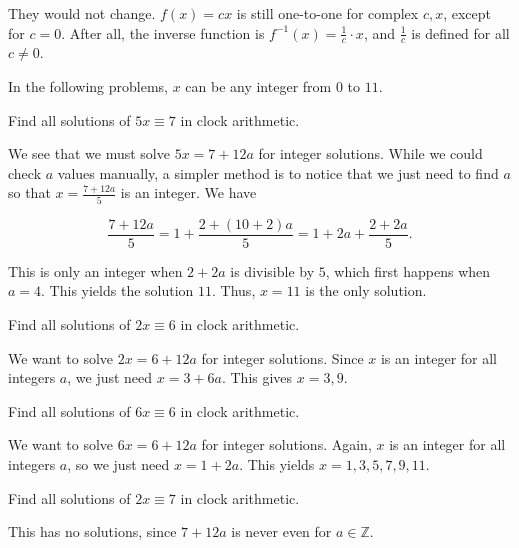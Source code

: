 \documentclass[../key.tex]{subfiles}
\begin{document}
They would not change. $f(x)=cx$ is still one-to-one for complex $c,x$, except for $c=0$. After all, the inverse function is $f^{-1}(x)=\frac{1}{c}\cdot x$, and $\frac{1}{c}$ is defined for all $c\neq 0$.

\begin{outer_problem}
\item In the following problems, $x$ can be any integer from $0$ to $11$.
\end{outer_problem}

\begin{inner_problem}[start=1]
\item Find all solutions of $5x\equiv 7$ in clock arithmetic.
\end{inner_problem}

We see that we must solve $5x = 7+12a$ for integer solutions. While we could check $a$ values manually, a simpler method is to notice that we just need to find $a$ so that $x=\frac{7+12a}{5}$ is an integer. We have

$$\frac{7+12a}{5} = 1+\frac{2+(10+2)a}{5} = 1+2a+\frac{2+2a}{5}.$$

This is only an integer when $2+2a$ is divisible by $5$, which first happens when $a=4$. This yields the solution $11$. Thus, $x=11$ is the only solution.

\begin{inner_problem}
\item Find all solutions of $2x\equiv 6$ in clock arithmetic.
\end{inner_problem}

We want to solve $2x=6+12a$ for integer solutions. Since $x$ is an integer for all integers $a$, we just need $x=3+6a$. This gives $x=3,9$.

\begin{inner_problem}
\item Find all solutions of $6x\equiv 6$ in clock arithmetic.
\end{inner_problem}

We want to solve $6x=6+12a$ for integer solutions. Again, $x$ is an integer for all integers $a$, so we just need $x=1+2a$. This yields $x=1,3,5,7,9,11$.

\begin{inner_problem}
\item Find all solutions of $2x\equiv 7$ in clock arithmetic.
\end{inner_problem}

This has no solutions, since $7+12a$ is never even for $a\in\mathbb{Z}$.
\end{document}
